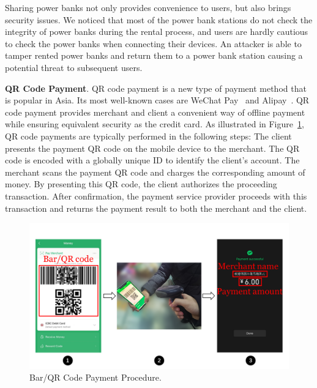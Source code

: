 
Sharing power banks not only provides convenience to users, but also brings security issues.  We noticed that most of the power bank stations do not
check the integrity of power banks during the rental process, and users are
hardly cautious to check the power banks when connecting their devices.  An
attacker is able to tamper rented power banks and return them to a power bank
station causing a potential threat to subsequent users.


\textbf{QR Code Payment}.
QR code payment is a new type of payment method that is popular in Asia. Its most well-known cases are WeChat Pay~\cite{Wechat-pay} and Alipay~\cite{AliPay}. QR code payment provides merchant and client a convenient way of offline payment while ensuring equivalent security as the credit card.
As illustrated in Figure~\ref{fig:qr_payment_procedure},
 QR code payments are typically performed in the following steps:
 The client presents the payment QR code on the mobile device to the merchant.
The QR code is encoded with a globally unique ID to identify the client's account.
 The merchant scans the payment QR code and charges the corresponding amount of money.
By presenting this QR code, the client authorizes the proceeding transaction.
 After confirmation, the payment service provider proceeds with this transaction and returns the payment result to both the merchant and the client.

\begin{figure}[t]
	\centering
	\includegraphics[width=\linewidth]{./Figs/qr_code_payment.png}
	\caption{Bar/QR Code Payment Procedure.}
	\label{fig:qr_payment_procedure}
\end{figure}


